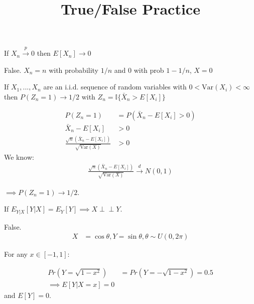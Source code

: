 \documentclass{exam}
\title{True/False Practice}
\newcommand{\indep}{\perp \!\!\! \perp}
\begin{document}
\maketitle
    


\begin{questions}
    
\question If $X_n \xrightarrow{p} 0$ then $E[X_n] \rightarrow 0$
\begin{solution}
False. $X_n = n$ with probability $1/n$ and 0 with prob $1 - 1/n$,  $X = 0$
\end{solution}



\question If $X_1,...,X_n$ are an i.i.d. sequence of random variables with $0 < \text{Var}(X_i) < \infty$ then 
$P(Z_n = 1) \rightarrow 1/2$ with $Z_n = \mathbb{I}\{\bar{X}_n > E[X_i]\}$


\begin{solution}
    \begin{align*}
    P(Z_n = 1) &= P(\bar{X}_n - E[X_i] > 0) \\
    \bar{X}_n - E[X_i] &> 0 \\
    \frac{
        \sqrt{n}(\bar{X}_n - E[X_i])
    }{
        \sqrt{\text{Var}(X)}
    } &> 0 
    \end{align*}
    We know:
    \begin{align*}
    \frac{
        \sqrt{n}(\bar{X}_n - E[X_i])
    }{
        \sqrt{\text{Var}(X)}
    } \xrightarrow{d} N(0, 1)
    \end{align*}

    $\implies P(Z_n = 1) \rightarrow 1/2$.

\end{solution}




    \question If $E_{Y | X}[Y | X ] = E_Y[Y] \implies X \indep Y$.

    \begin{solution}
        
    False. 
    \begin{align*}
        X &= \cos \theta, Y = \sin \theta, \theta \sim U(0, 2\pi)
    \end{align*}

    For any $x \in [-1, 1]$:

    \begin{align*}
        Pr(Y = \sqrt{1 - x^2}) &= Pr(Y = - \sqrt{1 - x^2}) = 0.5 \\
        \implies E[Y | X = x] = 0
    \end{align*}
    and $E[Y] = 0$.


\end{solution}
\end{questions}
\end{document}
